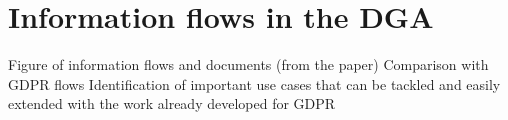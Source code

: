 \section{Information flows in the DGA}
\label{sec:dga_flows}

Figure of information flows and documents (from the paper)
Comparison with GDPR flows
Identification of important use cases that can be tackled and easily extended with the work already developed for GDPR